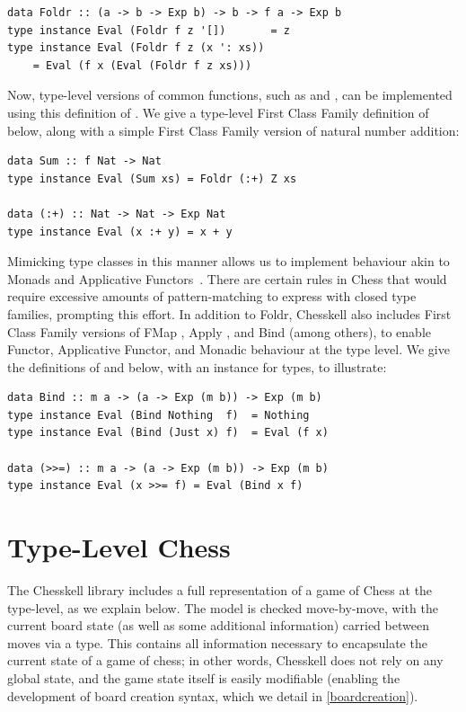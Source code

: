 \begin{lstlisting}
data Foldr :: (a -> b -> Exp b) -> b -> f a -> Exp b
type instance Eval (Foldr f z '[])       = z
type instance Eval (Foldr f z (x ': xs))
    = Eval (f x (Eval (Foldr f z xs)))
\end{lstlisting}

Now, type-level versions of common  functions, such as  and , can be implemented using this definition of . We give a type-level First Class Family definition of  below, along with a simple First Class Family version of natural number addition:

\begin{lstlisting}
data Sum :: f Nat -> Nat
type instance Eval (Sum xs) = Foldr (:+) Z xs

data (:+) :: Nat -> Nat -> Exp Nat
type instance Eval (x :+ y) = x + y
\end{lstlisting}

Mimicking type classes in this manner allows us to implement behaviour akin to Monads and Applicative Functors~\cite{applicatives}. There are certain rules in Chess that would require excessive amounts of pattern-matching to express with closed type families, prompting this effort. In addition to Foldr, Chesskell also includes First Class Family versions of FMap \inline{(<\$>)}, Apply \inline{<*>}, and Bind \inline{(>>=)} (among others), to enable Functor, Applicative Functor, and Monadic behaviour at the type level. We give the definitions of  and \inline{(>>=)} below, with an  instance for  types, to illustrate:

\begin{lstlisting}
data Bind :: m a -> (a -> Exp (m b)) -> Exp (m b)
type instance Eval (Bind Nothing  f)  = Nothing
type instance Eval (Bind (Just x) f)  = Eval (f x)

data (>>=) :: m a -> (a -> Exp (m b)) -> Exp (m b)
type instance Eval (x >>= f) = Eval (Bind x f)
\end{lstlisting}

\section{Type-Level Chess}

The Chesskell library includes a full representation of a game of Chess at the type-level, as we explain below. The model is checked move-by-move, with the current board state (as well as some additional information) carried between moves via a  type. This  contains all information necessary to encapsulate the current state of a game of chess; in other words, Chesskell does not rely on any global state, and the game state itself is easily modifiable (enabling the development of board creation syntax, which we detail in \cref{boardcreation}).

